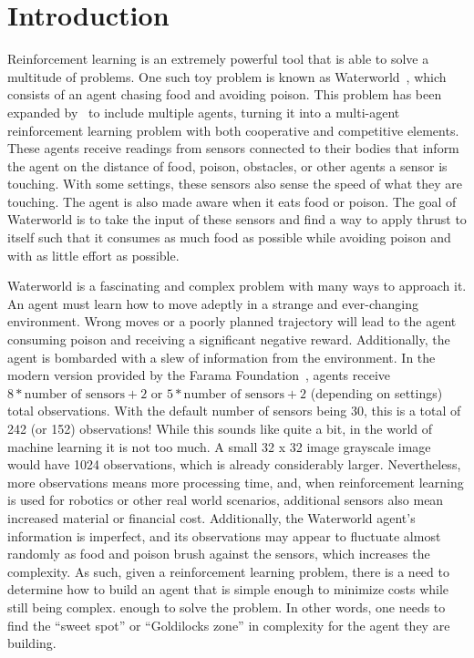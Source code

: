 \section{Introduction}\label{sec:introduction}
Reinforcement learning is an extremely powerful tool that is able to solve a multitude
of problems.
One such toy problem is known as Waterworld~\cite{Karpathy2015, Ho2016}, which consists
of an agent chasing food and avoiding poison.
This problem has been expanded by~\cite{Gupta2017} to include multiple agents,
turning it into a multi-agent reinforcement learning problem with both cooperative
and competitive elements.
These agents receive readings from sensors connected to their bodies that
inform the agent on the distance of food, poison, obstacles, or other agents a sensor
is touching.
With some settings, these sensors also sense the speed of what they are touching.
The agent is also made aware when it eats food or poison.
The goal of Waterworld is to take the input of these sensors and find a way to apply
thrust to itself such that it consumes as much food as possible while avoiding poison
and with as little effort as possible.

Waterworld is a fascinating and complex problem with many ways to approach it.
An agent must learn how to move adeptly in a strange and ever-changing environment.
Wrong moves or a poorly planned trajectory will lead to the agent consuming poison
and receiving a significant negative reward.
Additionally, the agent is bombarded with a slew of information from the environment.
In the modern version provided by the Farama Foundation~\cite{WaterworldDocumentation},
agents receive $8 * \text{number of sensors} + 2$ or
$5 * \text{number of sensors} + 2$ (depending on settings) total observations.
With the default number of sensors being 30, this is a total of 242 (or 152)
observations!
While this sounds like quite a bit, in the world of machine learning it is not too
much.
A small 32 x 32 image grayscale image would have 1024 observations, which is already
considerably larger.
Nevertheless, more observations means more processing time, and, when reinforcement
learning is used for robotics or other real world scenarios, additional sensors also
mean increased material or financial cost.
Additionally, the Waterworld agent's information is imperfect, and its observations
may appear to fluctuate almost randomly as food and poison brush against the sensors,
which increases the complexity.
As such, given a reinforcement learning problem, there is a need to determine how to
build an agent that is simple enough to minimize costs while still being complex.
enough to solve the problem.
In other words, one needs to find the ``sweet spot'' or ``Goldilocks zone'' in
complexity for the agent they are building.
